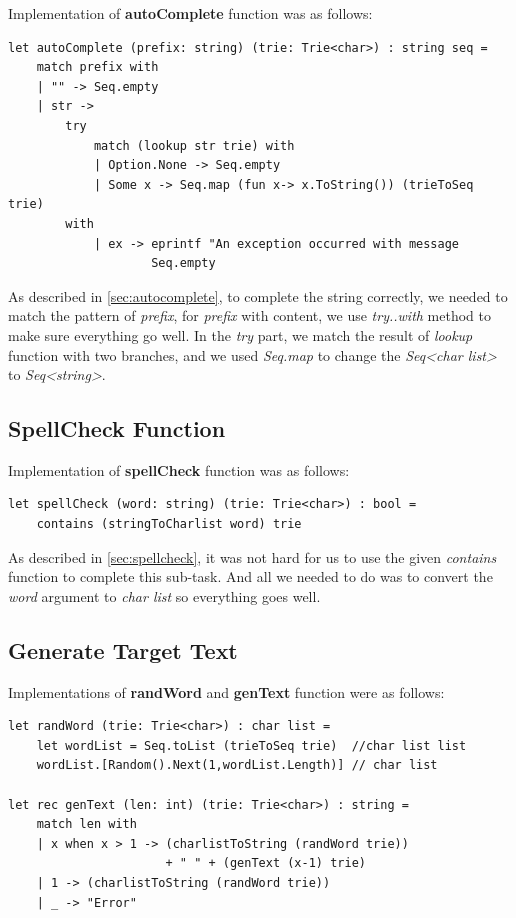\documentclass{article}
\begin{document}
Implementation of \textbf{autoComplete} function was as follows:

\begin{lstlisting}
let autoComplete (prefix: string) (trie: Trie<char>) : string seq = 
    match prefix with
    | "" -> Seq.empty
    | str -> 
        try
            match (lookup str trie) with
            | Option.None -> Seq.empty
            | Some x -> Seq.map (fun x-> x.ToString()) (trieToSeq trie)
        with
            | ex -> eprintf "An exception occurred with message 
                    Seq.empty
\end{lstlisting}

As described in \ref{sec:autocomplete}, to complete the string correctly, we needed to match the pattern of \emph{prefix}, for \emph{prefix} with content, we use \emph{try..with} method to make sure everything go well. In the \emph{try} part, we match the result of \emph{lookup} function with two branches, and we used \emph{Seq.map} to change the \emph{Seq<char list>} to \emph{Seq<string>}.

\subsection{SpellCheck Function}

Implementation of \textbf{spellCheck} function was as follows:

\begin{lstlisting}
let spellCheck (word: string) (trie: Trie<char>) : bool = 
    contains (stringToCharlist word) trie
\end{lstlisting}

As described in \ref{sec:spellcheck}, it was not hard for us to use the given \emph{contains} function to complete this sub-task. And all we needed to do was to convert the \emph{word} argument to \emph{char list} so everything goes well.

\subsection{Generate Target Text}

Implementations of \textbf{randWord} and \textbf{genText} function were as follows:

\begin{lstlisting}
let randWord (trie: Trie<char>) : char list = 
    let wordList = Seq.toList (trieToSeq trie)  //char list list
    wordList.[Random().Next(1,wordList.Length)] // char list

let rec genText (len: int) (trie: Trie<char>) : string =
    match len with
    | x when x > 1 -> (charlistToString (randWord trie)) 
                      + " " + (genText (x-1) trie)
    | 1 -> (charlistToString (randWord trie))
    | _ -> "Error"
\end{lstlisting}
\end{document}
